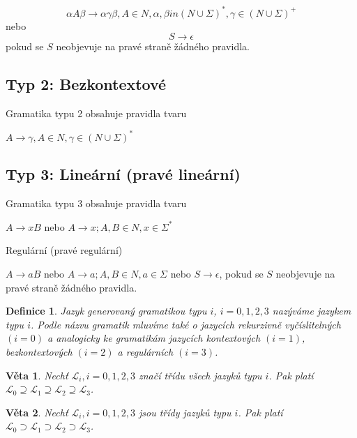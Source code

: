 \documentclass[a4paper, 11pt]{report}
\newtheorem{mydef}{Definice}[chapter]
\newtheorem{veta}{Věta}[chapter]
\begin{document}
$$ \alpha A \beta \to \alpha \gamma \beta, A \in N, \alpha, \beta in (N \cup \Sigma)^*, \gamma \in (N \cup \Sigma)^+$$
nebo 
$$S \to \epsilon$$
pokud se $S$ neobjevuje na pravé straně žádného pravidla.

\subsection{Typ 2: Bezkontextové}
Gramatika typu 2 obsahuje pravidla tvaru

$A \to \gamma, A \in N, \gamma \in (N \cup \Sigma)^*$

\subsection{Typ 3: Lineární (pravé lineární)}
Gramatika typu 3 obsahuje pravidla tvaru

$A \to xB$ nebo $A \to x; A, B \in N, x \in \Sigma^*$

Regulární (pravé regulární)

$A \to aB$ nebo $A \to a; A, B \in N, a \in \Sigma$ nebo $S \to \epsilon$, pokud se $S$ neobjevuje na pravé straně žádného pravidla.


\begin{mydef}
Jazyk generovaný gramatikou typu $i$, $i = 0, 1, 2, 3$ nazýváme jazykem typu $i$. Podle názvu gramatik mluvíme také o jazycích \emph{rekurzivně vyčíslitelných $(i=0)$} a analogicky ke gramatikám jazycích \emph{kontextových $(i=1)$}, \emph{bezkontextových $(i=2)$} a \emph{regulárních $(i=3)$}.
\end{mydef}

\begin{veta}
Nechť $\mathcal{L}_i, i = 0, 1, 2, 3$ značí třídu všech jazyků typu $i$. Pak platí $\mathcal{L}_0 \supseteq \mathcal{L}_1 \supseteq \mathcal{L}_2 \supseteq \mathcal{L}_3$.
\end{veta}

\begin{veta}
Nechť $\mathcal{L}_i, i = 0, 1, 2, 3$ jsou třídy jazyků typu $i$. Pak platí $\mathcal{L}_0 \supset \mathcal{L}_1 \supset \mathcal{L}_2 \supset \mathcal{L}_3$.
\end{veta}












\end{document}
